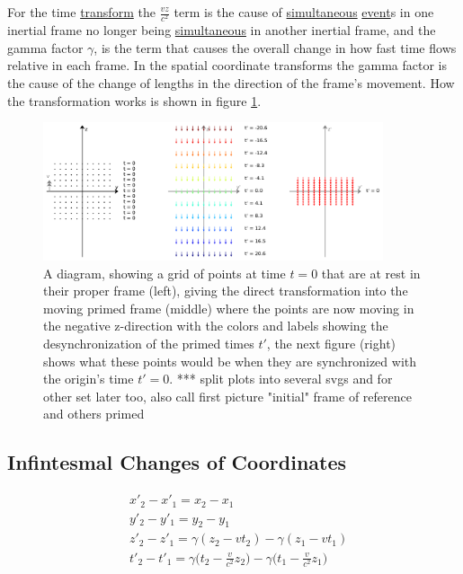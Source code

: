 For the time \hyperlink{def-transform}{transform} the $\frac{vz}{c^2}$ term is the cause of \hyperlink{def-simultaneity}{simultaneous} \hyperlink{def-event}{event}s in one inertial frame no longer being \hyperlink{def-simultaneity}{simultaneous} in another inertial frame, and the gamma factor $\gamma$, is the term that causes the overall change in how fast time flows relative in each frame. In the spatial coordinate transforms the gamma factor is the cause of the change of lengths in the direction of the frame's movement. How the transformation works is shown in figure \ref{fig: coordinate transform}.

\begin{figure}[H]
	\centering
	\includegraphics[width=10cm]{images/pdf/coordinate_transforms.pdf}
	\caption{A diagram, showing a grid of points at time $t=0$ that are at rest in their proper frame (left), giving the direct transformation into the moving primed frame (middle) where the points are now moving in the negative z-direction with the colors and labels showing the desynchronization of the primed times $t'$, the next figure (right) shows what these points would be when they are synchronized with the origin's time $t'=0$. *** split plots into several svgs and for other set later too, also call first picture "initial" frame of reference and others primed}
	\label{fig: coordinate transform}
\end{figure}

\subsection{Infintesmal Changes of Coordinates}

\begin{equation}
	\begin{aligned}
		 & x'_2 - x'_1 = x_2 - x_1                                                                               \\
		 & y'_2 - y'_1 = y_2 - y_1                                                                               \\
		 & z'_2 - z'_1 = \gamma ( z_2 - v t_2) - \gamma ( z_1 - v t_1)                                           \\
		 & t'_2 - t'_1=\gamma \bigg( t_2-\frac{v}{c^2} z_2 \bigg) - \gamma \bigg( t_1 - \frac{v}{c^2} z_1 \bigg)
	\end{aligned}
\end{equation}


